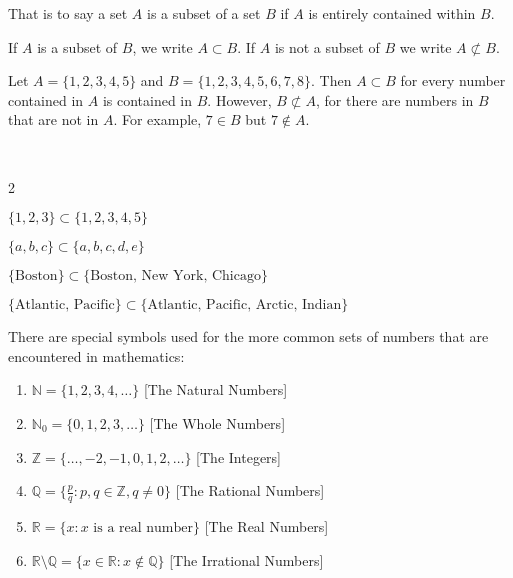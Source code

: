 \documentclass[crop=false,class=article,oneside]{standalone}
\begin{document}
        \begin{remark}
            That is to say a set $A$ is a subset of a set $B$ if $A$
            is entirely contained within $B$.
        \end{remark}
        \begin{notation}
            If $A$ is a subset of $B$, we write $A\subset B$. If $A$ is
            not a subset of $B$ we write $A\not\subset{B}$.
        \end{notation}
        \begin{example}
            Let $A=\{1,2,3,4,5\}$ and $B=\{1,2,3,4,5,6,7,8\}$.
            Then $A\subset B$ for every number contained in $A$ is
            contained in $B$. However, $B\not\subset{A}$, for there are
            numbers in $B$ that are not in $A$.
            For example, $7\in{B}$ but $7\notin{A}$.
        \end{example}
        \begin{example}
            \
            \begin{enumerate}
            \end{enumerate}
        \end{example}
        \begin{notation}
            There are special symbols used for the more common sets of
            numbers that are encountered in mathematics:
            \begin{enumerate}
                \item $\mathbb{N}=\{1,2,3,4,\hdots\}$
                      \hfill[The Natural Numbers]
                \item $\mathbb{N}_{0}=\{0,1,2,3,\hdots\}$
                      \hfill[The Whole Numbers]
                \item $\mathbb{Z}=\{\hdots,-2,-1,0,1,2,\hdots\}$
                      \hfill[The Integers]
                \item $\mathbb{Q}=\{\frac{p}{q}:p,q\in\mathbb{Z},q\ne{0}\}$
                      \hfill[The Rational Numbers]
                \item $\mathbb{R}=\{x:x\textrm{ is a real number}\}$
                      \hfill [The Real Numbers]
                \item $\mathbb{R}\setminus\mathbb{Q}%
                       =\{x\in\mathbb{R}:x\notin\mathbb{Q}\}$
                      \hfill[The Irrational Numbers]
            \end{enumerate}
        \end{notation}
\end{document}
